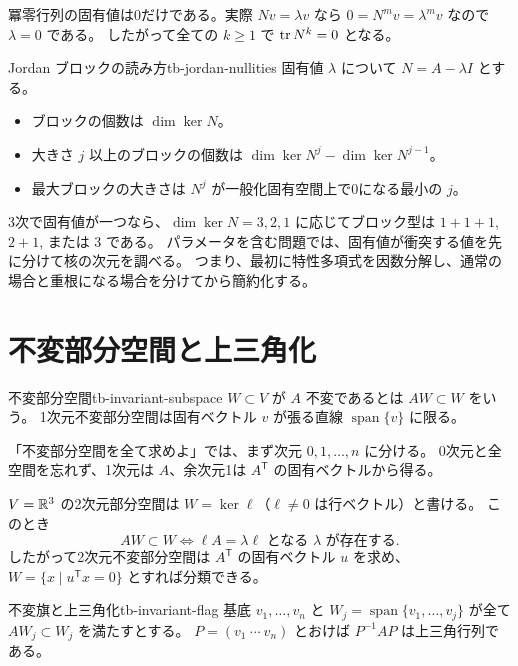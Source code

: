 冪零行列の固有値は0だけである。実際 $Nv=\lambda v$ なら
$0=N^mv=\lambda^mv$ なので $\lambda=0$ である。
したがって全ての $k\ge1$ で $\operatorname{tr} N^k=0$ となる。

\begin{proposition}{Jordan ブロックの読み方}{tb-jordan-nullities}
固有値 $\lambda$ について $N=A-\lambda I$ とする。
\begin{itemize}
  \item ブロックの個数は $\dim\ker N$。
  \item 大きさ $j$ 以上のブロックの個数は
        $\dim\ker N^j-\dim\ker N^{j-1}$。
  \item 最大ブロックの大きさは $N^j$ が一般化固有空間上で0になる最小の $j$。
\end{itemize}
\end{proposition}

3次で固有値が一つなら、$\dim\ker N=3,2,1$ に応じてブロック型は
$1+1+1$, $2+1$, または $3$ である。
パラメータを含む問題では、固有値が衝突する値を先に分けて核の次元を調べる。
つまり、最初に特性多項式を因数分解し、通常の場合と重根になる場合を分けてから簡約化する。

\section{不変部分空間と上三角化}

\begin{definition}{不変部分空間}{tb-invariant-subspace}
$W\subset V$ が $A$ 不変であるとは $AW\subset W$ をいう。
1次元不変部分空間は固有ベクトル $v$ が張る直線 $\operatorname{span}\{v\}$ に限る。
\end{definition}

「不変部分空間を全て求めよ」では、まず次元 $0,1,\ldots,n$ に分ける。
0次元と全空間を忘れず、1次元は $A$、余次元1は $A^{\mathsf T}$ の固有ベクトルから得る。

$V=\mathbb{R}^3$ の2次元部分空間は $W=\ker \ell$（$\ell\ne0$ は行ベクトル）と書ける。
このとき
\[
AW\subset W
\Longleftrightarrow \ell A=\lambda\ell\text{ となる }\lambda\text{ が存在する}.
\]
したがって2次元不変部分空間は $A^{\mathsf T}$ の固有ベクトル $u$ を求め、
$W=\{x\mid u^{\mathsf T}x=0\}$ とすれば分類できる。

\begin{theorem}{不変旗と上三角化}{tb-invariant-flag}
基底 $v_1,\ldots,v_n$ と
$W_j=\operatorname{span}\{v_1,\ldots,v_j\}$ が全て $AW_j\subset W_j$ を満たすとする。
$P=(v_1\ \cdots\ v_n)$ とおけば $P^{-1}AP$ は上三角行列である。
\end{theorem}

